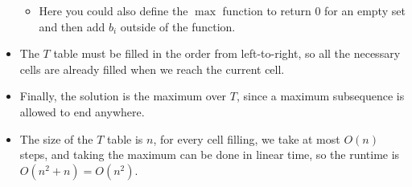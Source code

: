 \begin{itemize}
    \begin{itemize}
        \item Here you could also define the $\max$ function to return $0$ for an empty set and then add $b_i$ outside of the function.
    \end{itemize}
    \item The $T$ table must be filled in the order from left-to-right, so all the necessary cells are already filled when we reach the current cell.
    \item Finally, the solution is the maximum over $T$, since a maximum subsequence is allowed to end anywhere.
    \item The size of the $T$ table is $n$, for every cell filling, we take at most $O(n)$ steps, and taking the maximum can be done in linear time, so the runtime is $O(n^2+n) = O(n^2)$.
\end{itemize}